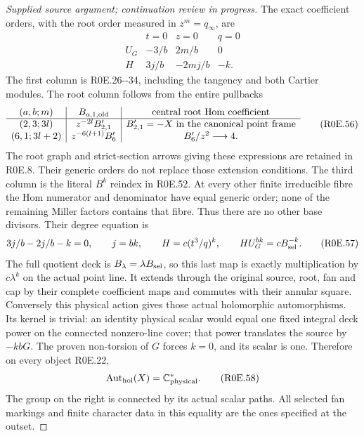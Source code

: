 \begin{proof}[Supplied source argument; continuation review in progress]
The exact coefficient orders, with the root order measured in
\(z^m=q_\infty\), are
\[
\begin{array}{c|ccc}
 &t=0&z=0&q=0\\ \hline
 U_G&-3/b&2m/b&0\\
 H&3j/b&-2mj/b&-k.
\end{array}                                                       \tag{R0E.55}
\]
The first column is R0E.26-\/-34, including the tangency and both
Cartier modules. The root column follows from the entire pullbacks
\[
 \begin{array}{c|c|c}
 (a,b;m)& B_{a,1,\rm old}&\text{central root Hom coefficient}\\ \hline
 (2,3;3l)&z^{-2l}B'_{2,1}&B'_{2,1}=-X\text{ in the canonical point frame}\\
 (6,1;3l+2)&z^{-6(l+1)}B'_6&B'_6/z^2\longrightarrow4 .
 \end{array}                                                       \tag{R0E.56}
\]
The root graph and strict-section arrows giving these expressions
are retained in R0E.8. Their generic orders do not replace those
extension conditions. The third column is the literal \(B^k\)
reindex in R0E.52. At every other finite irreducible fibre the Hom
numerator and denominator have equal generic order; none of the
remaining Miller factors contains that fibre. Thus there are no
other base divisors. Their degree equation is
\[
 3j/b-2j/b-k=0,\qquad j=bk,\qquad
 H=c(t^3/q)^k,\qquad H U_G^{bk}=c B_{\rm sel}^{-k}.
 \tag{R0E.57}
\]
The full quotient deck is \(B_\lambda=\lambda B_{\rm sel}\), so
this last map is exactly multiplication by \(c\lambda^k\) on
the actual point line. It extends through the original source,
root, fan and cap by their complete coefficient maps and commutes
with their annular square. Conversely this physical action gives
those actual holomorphic automorphisms. Its kernel is trivial:
an identity physical scalar would equal one fixed integral deck
power on the connected nonzero-line cover; that power translates
the source by \(-kbG\). The proven non-torsion of \(G\) forces
\(k=0\), and its scalar is one. Therefore on every object R0E.22,
\[
                  \operatorname{Aut}_{\rm hol}(X)
                        =\mathbb C^*_{\rm physical}.
 \tag{R0E.58}
\]
The group on the right is connected by its actual scalar paths.
All selected fan markings and finite character data in this equality
are the ones specified at the outset.

\par


\end{proof}
